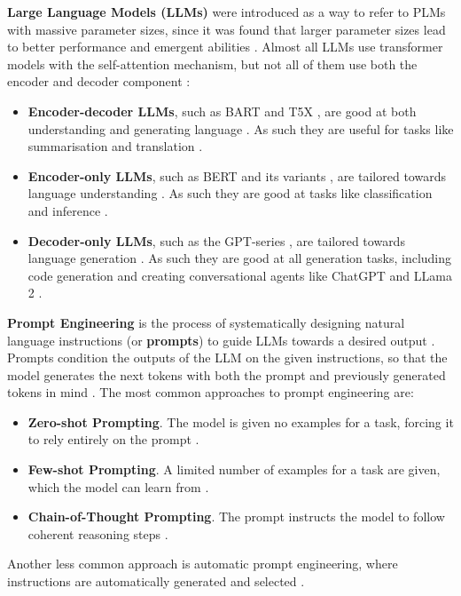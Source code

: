 \documentclass[a4paper]{article}
\begin{document}
\textbf{Large Language Models (LLMs)} were introduced as a way to refer to PLMs with massive parameter sizes, since it was found that larger parameter sizes lead to better performance and emergent abilities \cite{kaplan2020scaling,wei2022emergent}. Almost all LLMs use transformer models with the self-attention mechanism, but not all of them use both the encoder and decoder component \cite{hou2024}:
\begin{itemize}
    \item \textbf{Encoder-decoder LLMs}, such as BART \cite{lewis2019bart} and T5X \cite{roberts2022t5x}, are good at both understanding and generating language \cite{hou2024}. As such they are useful for tasks like summarisation and translation \cite{cho2014encoderdecoder, Asadi2020encoderdecoder}.
    \item \textbf{Encoder-only LLMs}, such as BERT and its variants \cite{devlin2019bert,liu2019roberta,sanh2019distilbert,lan2020albert}, are tailored towards language understanding \cite{hou2024}. As such they are good at tasks like classification and inference \cite{koroteev2021encoder}. 
    \item \textbf{Decoder-only LLMs}, such as the GPT-series \cite{radford2018gpt,brown2020gpt3,openai2024gpt4}, are tailored towards language generation \cite{hou2024}. As such they are good at all generation tasks, including code generation \cite{poldrack2023} and creating conversational agents like ChatGPT \cite{OpenAI2023chatgpt} and LLama 2 \cite{touvron2023llama2}.
\end{itemize}


\textbf{Prompt Engineering} is the process of systematically designing natural language instructions (or \textbf{prompts}) to guide LLMs towards a desired output \cite{ronanki2023}. Prompts condition the outputs of the LLM on the given instructions, so that the model generates the next tokens with both the prompt and previously generated tokens in mind \cite{jurafsky2025}. The most common approaches to prompt engineering are:
\begin{itemize}
    \item \textbf{Zero-shot Prompting}. The model is given no examples for a task, forcing it to rely entirely on the prompt \cite{radford2019language}.
    \item \textbf{Few-shot Prompting}. A limited number of examples for a task are given, which the model can learn from \cite{brown2020fewshot}.
    \item \textbf{Chain-of-Thought Prompting}. The prompt instructs the model to follow coherent reasoning steps \cite{wei2022chain}.
\end{itemize}
Another less common approach is automatic prompt engineering, where instructions are automatically generated and selected \cite{zhou2023ape}.
\end{document}
